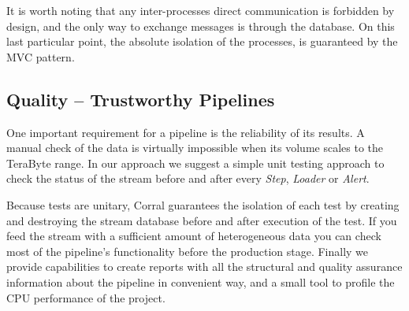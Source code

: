 \documentclass[final,5p,times,twocolumn,authoryear]{elsarticle}
\begin{document}
\textcolor{blue!95}{
It is worth noting that any inter-processes direct communication is forbidden by design,
and the only way to exchange messages is through the database.}
%
On this last particular point, the absolute isolation of the processes,
is guaranteed by the MVC pattern.
%
\subsection{Quality -- Trustworthy Pipelines}
%
One important requirement for a pipeline is the reliability of its results.
A manual check of the data is virtually impossible when its volume scales to the TeraByte range.
In our approach we suggest a simple unit testing approach to check the status of the stream before and after every
\textit{Step}, \textit{Loader} or \textit{Alert}.

Because tests are unitary, Corral guarantees the isolation of each
test by creating and destroying the stream database before and after execution of the test.
%
If you feed the stream with a sufficient amount of heterogeneous data you can check most of the pipeline's functionality before the production stage. Finally we provide capabilities to create reports with all the structural and quality assurance information about the pipeline in convenient way, and a small tool to profile
the CPU performance of the project.
%
\end{document}
